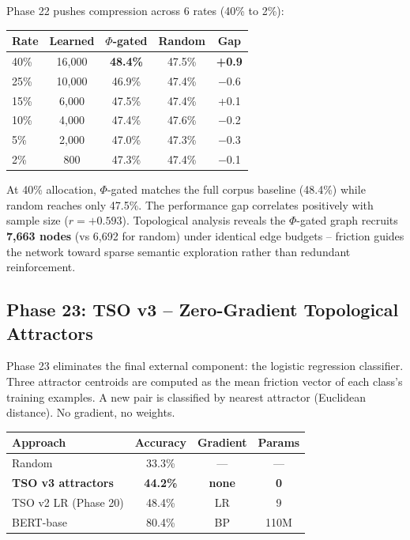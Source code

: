 \documentclass{article}
\begin{document}
Phase 22 pushes compression across 6 rates (40\% to 2\%):

\begin{center}
\begin{tabular}{lcccc}
\toprule
Rate & Learned & $\Phi$-gated & Random & Gap \\
\midrule
40\% & 16,000 & \textbf{48.4\%} & 47.5\% & \textbf{+0.9} \\
25\% & 10,000 & 46.9\% & 47.4\% & $-$0.6 \\
15\% & 6,000 & 47.5\% & 47.4\% & +0.1 \\
10\% & 4,000 & 47.4\% & 47.6\% & $-$0.2 \\
5\% & 2,000 & 47.0\% & 47.3\% & $-$0.3 \\
2\% & 800 & 47.3\% & 47.4\% & $-$0.1 \\
\bottomrule
\end{tabular}
\end{center}

At 40\% allocation, $\Phi$-gated matches the full corpus baseline (48.4\%) while random reaches only 47.5\%. The performance gap correlates positively with sample size ($r = +0.593$). Topological analysis reveals the $\Phi$-gated graph recruits \textbf{7,663 nodes} (vs 6,692 for random) under identical edge budgets -- friction guides the network toward sparse semantic exploration rather than redundant reinforcement.

\subsection{Phase 23: TSO v3 -- Zero-Gradient Topological Attractors}

Phase 23 eliminates the final external component: the logistic regression classifier. Three attractor centroids are computed as the mean friction vector of each class's training examples. A new pair is classified by nearest attractor (Euclidean distance). No gradient, no weights.

\begin{center}
\begin{tabular}{lccc}
\toprule
Approach & Accuracy & Gradient & Params \\
\midrule
Random & 33.3\% & --- & --- \\
\textbf{TSO v3 attractors} & \textbf{44.2\%} & \textbf{none} & \textbf{0} \\
TSO v2 LR (Phase 20) & 48.4\% & LR & 9 \\
BERT-base & 80.4\% & BP & 110M \\
\bottomrule
\end{tabular}
\end{center}
\end{document}
